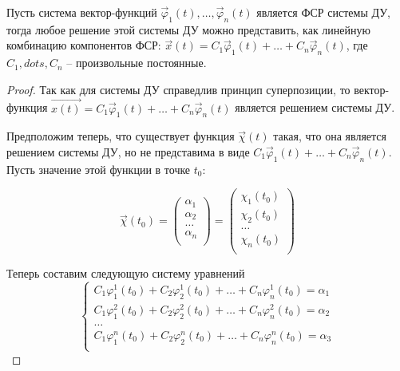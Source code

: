 \begin{theorem}
    Пусть система вектор-функций $\vec \varphi_1(t), \dots, \vec \varphi_n(t)$ является ФСР системы ДУ, тогда
    любое решение этой системы ДУ можно представить, как линейную комбинацию компонентов ФСР: 
    $\vec x(t) = C_1 \vec \varphi_1(t) + \dots + C_n \vec \varphi_n(t)$, где $C_1, dots, C_n$ -- произвольные постоянные.
\end{theorem}
\begin{proof}
    Так как для системы ДУ справедлив принцип суперпозиции, то вектор-функция $\vec{x(t)} = C_1 \vec \varphi_1(t) + \dots + C_n \vec \varphi_n(t)$ является решением системы ДУ.
    
    Предположим теперь, что существует функция $\vec{\chi}(t)$ такая, что она является решением системы ДУ, но не представима в виде $C_1 \vec \varphi_1(t) + \dots + C_n \vec \varphi_n(t)$. Пусть значение этой функции в точке $t_0$:
    
    \begin{equation}
        \vec{\chi}(t_0) = 
        \begin{pmatrix}
            \alpha_1 \\
            \alpha_2 \\
            \dots \\
            \alpha_n \\
        \end{pmatrix} = 
        \begin{pmatrix}
            \chi_1(t_0) \\
            \chi_2(t_0) \\
            \dots \\
            \chi_n(t_0) \\
        \end{pmatrix}
    \end{equation}
    
    Теперь составим следующую систему уравнений
    \begin{equation}
        \begin{cases}
            C_1 \varphi_1^1(t_0) + C_2 \varphi_2^1(t_0) + \dots + C_n \varphi_n^1(t_0) = \alpha_1 \\
            C_1 \varphi_1^2(t_0) + C_2 \varphi_2^2(t_0) + \dots + C_n \varphi_n^2(t_0) = \alpha_2 \\
            \dots \\
            C_1 \varphi_1^n(t_0) + C_2 \varphi_2^n(t_0) + \dots + C_n \varphi_n^n(t_0) = \alpha_3 \\
        \end{cases}
    \end{equation}
    

\end{proof}
